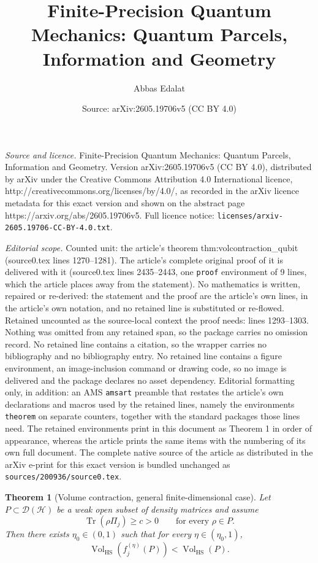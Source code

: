 \documentclass[10pt,a4paper]{amsart}
\title{Finite-Precision Quantum Mechanics: Quantum Parcels, Information and Geometry}
\author{Abbas Edalat}
\date{Source: arXiv:2605.19706v5 (CC BY 4.0)}
\newtheorem{theorem}{Theorem}
\begin{document}
\maketitle

\noindent\emph{Source and licence.} Finite-Precision Quantum Mechanics: Quantum Parcels, Information and Geometry. Version arXiv:2605.19706v5 (CC BY 4.0), distributed by arXiv under the Creative Commons Attribution 4.0 International licence, http://creativecommons.org/licenses/by/4.0/, as recorded in the arXiv licence metadata for this exact version and shown on the abstract page https://arxiv.org/abs/2605.19706v5. Full licence notice: \texttt{licenses/arxiv-2605.19706-CC-BY-4.0.txt}.\par\smallskip

\noindent\textit{Editorial scope.} Counted unit: the article's theorem thm:volcontraction\_qubit (source0.tex lines 1270--1281). The article's complete original proof of it is delivered with it (source0.tex lines 2435--2443, one \texttt{proof} environment of 9 lines, which the article places away from the statement). No mathematics is written, repaired or re-derived: the statement and the proof are the article's own lines, in the article's own notation, and no retained line is substituted or re-flowed.  Retained uncounted as the source-local context the proof needs: lines 1293--1303.  Nothing was omitted from any retained span, so the package carries no omission record.  No retained line contains a citation, so the wrapper carries no bibliography and no bibliography entry.  No retained line contains a figure environment, an image-inclusion command or drawing code, so no image is delivered and the package declares no asset dependency.  Editorial formatting only, in addition: an AMS \texttt{amsart} preamble that restates the article's own declarations and macros used by the retained lines, namely the environments \texttt{theorem} on separate counters, together with the standard packages those lines need.  The retained environments print in this document as Theorem 1 in order of appearance, whereas the article prints the same items with the numbering of its own full document.  The complete native source of the article as distributed in the arXiv e-print for this exact version is bundled unchanged as \texttt{sources/200936/source0.tex}.
\begin{theorem}[Volume contraction, general finite-dimensional case]
\label{thm:volcontraction_nqubits}
Let \(P\subset\mathcal{D}(\mathcal{H})\) be a weak open subset of density matrices and assume
\[
\operatorname{Tr}(\rho\Pi_j)\ge c>0 \qquad\text{for every }\rho\in P.
\]
Then there exists \(\eta_0\in(0,1)\) such that for every \(\eta\in(\eta_0,1)\),
\[
\operatorname{Vol}_{\mathrm{HS}}(f_j^{(\eta)}(P))<\operatorname{Vol}_{\mathrm{HS}}(P).
\]
\end{theorem}
\end{document}
